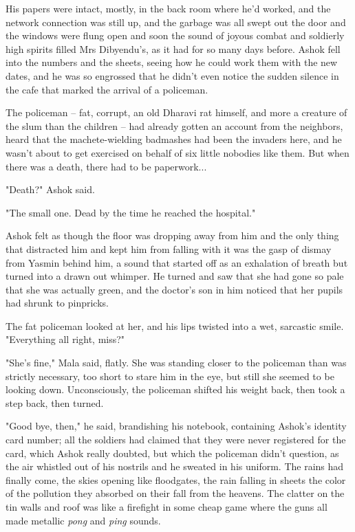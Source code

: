 His papers were intact, mostly, in the back room where he'd worked,
and the network connection was still up, and the garbage was all
swept out the door and the windows were flung open and soon the
sound of joyous combat and soldierly high spirits filled Mrs
Dibyendu's, as it had for so many days before. Ashok fell into the
numbers and the sheets, seeing how he could work them with the new
dates, and he was so engrossed that he didn't even notice the
sudden silence in the cafe that marked the arrival of a policeman.

The policeman -- fat, corrupt, an old Dharavi rat himself, and more
a creature of the slum than the children -- had already gotten an
account from the neighbors, heard that the machete-wielding
badmashes had been the invaders here, and he wasn't about to get
exercised on behalf of six little nobodies like them. But when
there was a death, there had to be paperwork...

"Death?" Ashok said.

"The small one. Dead by the time he reached the hospital."

Ashok felt as though the floor was dropping away from him and the
only thing that distracted him and kept him from falling with it
was the gasp of dismay from Yasmin behind him, a sound that started
off as an exhalation of breath but turned into a drawn out whimper.
He turned and saw that she had gone so pale that she was actually
green, and the doctor's son in him noticed that her pupils had
shrunk to pinpricks.

The fat policeman looked at her, and his lips twisted into a wet,
sarcastic smile. "Everything all right, miss?"

"She's fine," Mala said, flatly. She was standing closer to the
policeman than was strictly necessary, too short to stare him in
the eye, but still she seemed to be looking down. Unconsciously,
the policeman shifted his weight back, then took a step back, then
turned.

"Good bye, then," he said, brandishing his notebook, containing
Ashok's identity card number; all the soldiers had claimed that
they were never registered for the card, which Ashok really
doubted, but which the policeman didn't question, as the air
whistled out of his nostrils and he sweated in his uniform. The
rains had finally come, the skies opening like floodgates, the rain
falling in sheets the color of the pollution they absorbed on their
fall from the heavens. The clatter on the tin walls and roof was
like a firefight in some cheap game where the guns all made
metallic \emph{pong} and \emph{ping} sounds.

